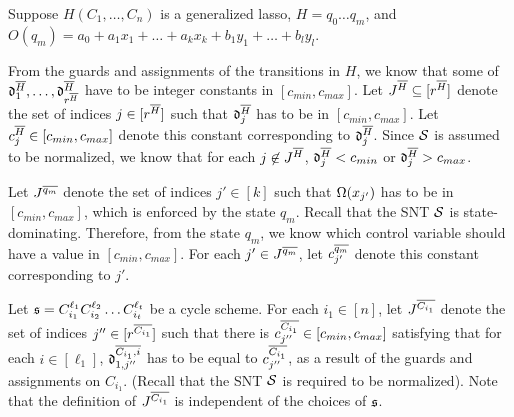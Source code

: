 Suppose $H (C_1, \dots, C_n)$ is a generalized lasso, $H=q_0 \dots q_m$, and $O(q_m)=a_0 + a_1 x_1 + \dots + a_k x_k + b_1 y_1 + \dots + b_l y_l$.

From the guards and assignments of the transitions in $H$, we know that some of $\mathfrak{d}^{\overline{H}}_1,\dots, \mathfrak{d}^{\overline{H}}_{r^{\overline{H}}}$ have to be integer constants in $[c_{min}, c_{max}]$. Let $J^{\overline{H}} \subseteq [r^{\overline{H}}]$ denote the set of indices $j \in [r^{\overline{H}}]$ such that $\mathfrak{d}^{\overline{H}}_j$ has to be in $[c_{min}, c_{max}]$. Let $c^{\overline{H}}_j \in [c_{min}, c_{max}]$ denote this constant corresponding to $\mathfrak{d}^{\overline{H}}_j$. Since ${\mathcal{S} }$ is assumed to be normalized, we know that for each $j \not \in J^{\overline{H}}$,  $\mathfrak{d}^{\overline{H}}_j < c_{min}$ or $\mathfrak{d}^{\overline{H}}_j > c_{max}$.
%
%
%
%
\smallskip\\
\bigskip

Let $J^{\overline{q_m}}$ denote the set of indices $j' \in [k]$ such that $\Omega(x_{j'})$ has to be in $[c_{min}, c_{max}]$, which is enforced by the state $q_m$. Recall that the SNT ${\mathcal{S} }$ is state-dominating. Therefore, from the state $q_m$, we know which control variable should have a value in $[c_{min},c_{max}]$. For each $j' \in J^{\overline{q_m}}$, let $c^{\overline{q_m}}_{j'}$ denote this constant corresponding to $j'$. 

Let ${\mathfrak{s} }=C_{i_1}^{\ell_1} C^{\ell_2}_{i_2} \dots C^{\ell_t}_{i_t}$ be a cycle scheme. 
For each $i_1 \in [n]$, let $J^{\overline{C_{i_1}}}$ denote the set of indices $j'' \in [r^{\overline{C_{i_1}}}]$ such that there is $c^{\overline{C_{i_1}}}_{j''} \in [c_{min}, c_{max}]$ satisfying that for each $i \in [\ell_1]$, $\mathfrak{d}^{\overline{C_{i_1}, i}}_{1, j''}$ has to be equal to $c^{\overline{C_{i_1}}}_{j''}$, as a result of the guards and assignments on $C_{i_1}$. (Recall that the SNT ${\mathcal{S} }$ is required to be normalized). Note that the definition of $J^{\overline{C_{i_1}}}$ is independent of the choices of ${\mathfrak{s} }$.

